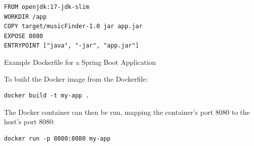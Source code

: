 \documentclass[a4paper,11pt]{article}
\newenvironment{code}{\captionsetup{type=listing}}{}
\begin{document}
\begin{code}
\begin{verbatim}
FROM openjdk:17-jdk-slim
WORKDIR /app
COPY target/musicFinder-1.0 jar app.jar
EXPOSE 8080
ENTRYPOINT ["java", "-jar", "app.jar"]
\end{verbatim}
\caption{Example Dockerfile for a Spring Boot Application}
\end{code}

To build the Docker image from the Dockerfile:
\begin{verbatim}
docker build -t my-app .
\end{verbatim}

The Docker container can then be run, mapping the container's port 8080 to the host's port 8080:
\begin{verbatim}
docker run -p 8080:8080 my-app
\end{verbatim}
\end{document}
